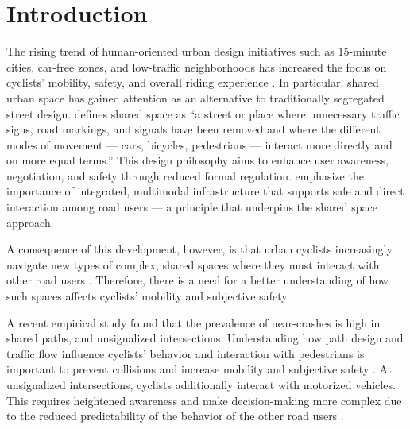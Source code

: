 \documentclass[3p,authoryear]{elsarticle}
\begin{document}
\section{Introduction}
The rising trend of human-oriented urban design initiatives such as 15-minute
cities, car-free zones, and low-traffic neighborhoods has increased the focus on
cyclists' mobility, safety, and overall riding experience
\citep{buehler2021covid,ballo2023ebike}. In particular, shared urban space has
gained attention as an alternative to traditionally segregated street design.
\citet{hamiltonbaillie2008shared} defines shared space as ``a street or place
where unnecessary traffic signs, road markings, and signals have been removed
and where the different modes of movement --- cars, bicycles, pedestrians ---
interact more directly and on more equal terms.'' This design philosophy aims to
enhance user awareness, negotiation, and safety through reduced formal
regulation. \citet*{buehler2008making} emphasize the importance of integrated,
multimodal infrastructure that supports safe and direct interaction among road
users --- a principle that underpins the shared space approach.

A consequence of this development, however, is that urban cyclists increasingly
navigate new types of complex, shared spaces where they must interact with other
road users \citep{mesimaki2021near,poulos2017near,takanashi2018analysis}.
Therefore, there is a need for a better understanding of how such spaces affects
cyclists' mobility and subjective safety.

A recent empirical study \citet{chou2024comparative} found that the prevalence
of near-crashes is high in shared paths, and unsignalized intersections.
Understanding how path design and traffic flow influence cyclists' behavior and
interaction with pedestrians is important to prevent collisions and increase
mobility and subjective safety \citep{zhang2023space,zhang2017study}. At
unsignalized intersections, cyclists additionally interact with motorized
vehicles. This requires heightened awareness and make decision-making more
complex due to the reduced predictability of the behavior of the other road
users \citep{mohammadi2024understanding,wongwaiwit2011analysis}.
\end{document}
